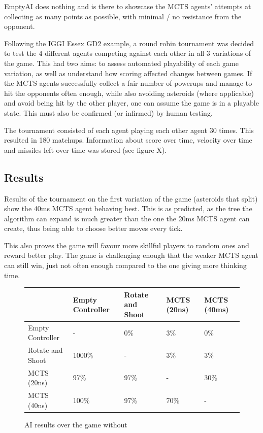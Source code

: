 EmptyAI does nothing and is there to showcase the MCTS agents’ attempts at collecting as many points as possible, with minimal / no resistance from the opponent.

Following the IGGI Essex GD2 example, a round robin tournament was decided to test the 4 different agents competing against each other in all 3 variations of the game. This had two aims: to assess automated playability of each game variation, as well as understand how scoring affected changes between games. If the MCTS agents successfully collect a fair number of powerups and manage to hit the opponents often enough, while also avoiding asteroids (where applicable) and avoid being hit by the other player, one can assume the game is in a playable state. This must also be confirmed (or infirmed) by human testing.

The tournament consisted of each agent playing each other agent 30 times. This resulted in 180 matchups. Information about score over time, velocity over time and missiles left over time was stored (see figure X).

\subsection{Results}

Results of the tournament on the first variation of the game (asteroids that split) show the 40ms MCTS agent behaving best. This is as predicted, as the tree the algorithm can expand is much greater than the one the 20ms MCTS agent can create, thus being able to choose better moves every tick. 

This also proves the game will favour more skillful players to random ones and reward better play. The game is challenging enough that the weaker MCTS agent can still win, just not often enough compared to the one giving more thinking time.

\begin{figure}
	\caption{AI results over the game without}
	\begin{tabular}{p{7.5em} | p{4.5em} p{4.5em} p{4.5em} p{4.5em}}
		&
			Empty Controller &
			Rotate and Shoot &
			MCTS (20ns) &
			MCTS (40ms) \\ \hline
		Empty Controller &
			-&
			0\% &
			3\% &
			0\% \\
		Rotate and Shoot &
			1000\% &
			-&
			3\% &
			3\% \\ 
		MCTS (20ns) &
			97\% &
			97\% &
			-&
			30\% \\
		MCTS (40ns) &
			100\% &
			97\% &
			70\% &
			-\\
	\end{tabular}
\end{figure}

